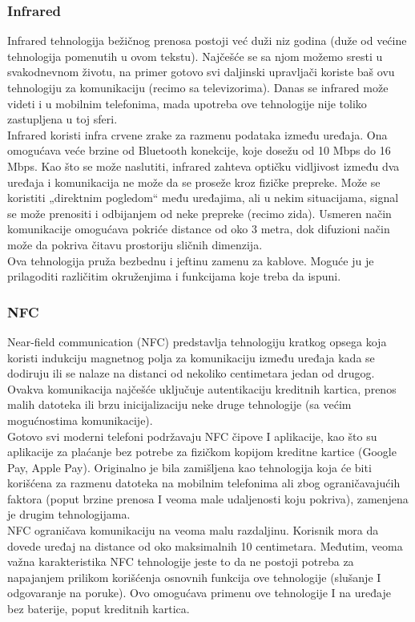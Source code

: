 \documentclass[a4paper]{article}
\begin{document}
{        \subsubsection{Infrared}
Infrared tehnologija bežičnog prenosa postoji već duži niz godina (duže od većine tehnologija pomenutih u ovom tekstu). Najčešće se sa njom možemo sresti u svakodnevnom životu, na primer gotovo svi daljinski upravljači  koriste baš ovu tehnologiju za komunikaciju (recimo sa televizorima). Danas se infrared može videti i u mobilnim telefonima, mada upotreba ove tehnologije nije toliko zastupljena u toj sferi.\\
Infrared koristi infra crvene zrake za razmenu podataka između uređaja. Ona omogućava veće brzine od Bluetooth konekcije, koje dosežu od 10 Mbps do 16 Mbps.
Kao što se može naslutiti, infrared zahteva optičku vidljivost između dva uređaja i komunikacija ne može da se proseže kroz fizičke prepreke. Može se koristiti „direktnim pogledom“ među uređajima, ali u nekim situacijama, signal se može prenositi i odbijanjem od neke prepreke (recimo zida). Usmeren način komunikacije omogućava pokriće distance od oko 3 metra, dok difuzioni način može da pokriva čitavu prostoriju sličnih dimenzija. \\
Ova tehnologija pruža bezbednu i jeftinu zamenu za kablove. Moguće ju je prilagoditi različitim okruženjima i funkcijama koje treba da ispuni.\\

        \subsubsection{NFC}
Near-field communication (NFC) predstavlja tehnologiju kratkog opsega koja koristi indukciju magnetnog polja za komunikaciju između uređaja kada se dodiruju ili se nalaze na distanci od nekoliko centimetara jedan od drugog. Ovakva komunikacija najčešće uključuje autentikaciju kreditnih kartica, prenos malih datoteka ili brzu inicijalizaciju neke druge tehnologije (sa većim mogućnostima komunikacije).\\
Gotovo svi moderni telefoni podržavaju NFC čipove I aplikacije, kao što su aplikacije za plaćanje bez potrebe za fizičkom kopijom kreditne kartice (Google Pay, Apple Pay). Originalno je bila zamišljena kao tehnologija koja će biti korišćena za razmenu datoteka na mobilnim telefonima ali zbog ograničavajućih faktora (poput brzine prenosa I veoma male udaljenosti koju pokriva), zamenjena je drugim tehnologijama.\\
NFC ograničava komunikaciju na veoma malu razdaljinu. Korisnik mora da dovede uređaj na distance od oko maksimalnih 10 centimetara. Međutim, veoma važna karakteristika NFC tehnologije jeste to da ne postoji potreba za napajanjem prilikom korišćenja osnovnih funkcija ove tehnologije (slušanje I odgovaranje na poruke). Ovo omogućava primenu ove tehnologije I na uređaje bez baterije, poput kreditnih kartica. \cite{NFC}\\

}
\end{document}
